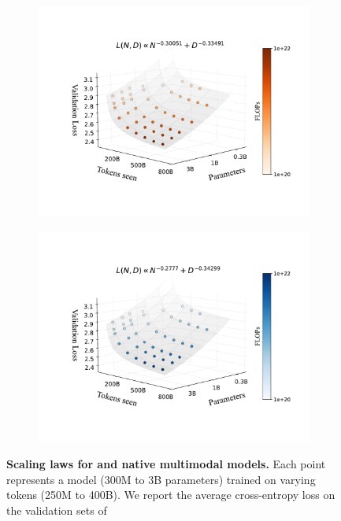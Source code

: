 
\begin{figure}[t!]
    \centering
    \captionsetup{type=figure}
    \begin{subfigure}[t]{0.48\linewidth}
        \centering
        \includegraphics[width=1.02\linewidth]{assets/early/3d_scaling_early.pdf}
    \end{subfigure}
    \hfil
    \begin{subfigure}[t]{0.48\linewidth}
        \centering
        \includegraphics[width=1.02\linewidth]{assets/early/3d_scaling_late.pdf}
    \end{subfigure}
    \vspace{5pt}
    \setlength{\fboxsep}{0.5pt}
    \setlength{\fboxrule}{0pt}
    \caption{\textbf{Scaling laws for  and 
    native multimodal models.} Each point represents a model (300M to 3B
    parameters) trained on varying  tokens (250M to 400B). We
    report the average cross-entropy loss on the validation sets of
    }
    \label{fig:early_vs_late_scaleflops_3d}
\end{figure}
